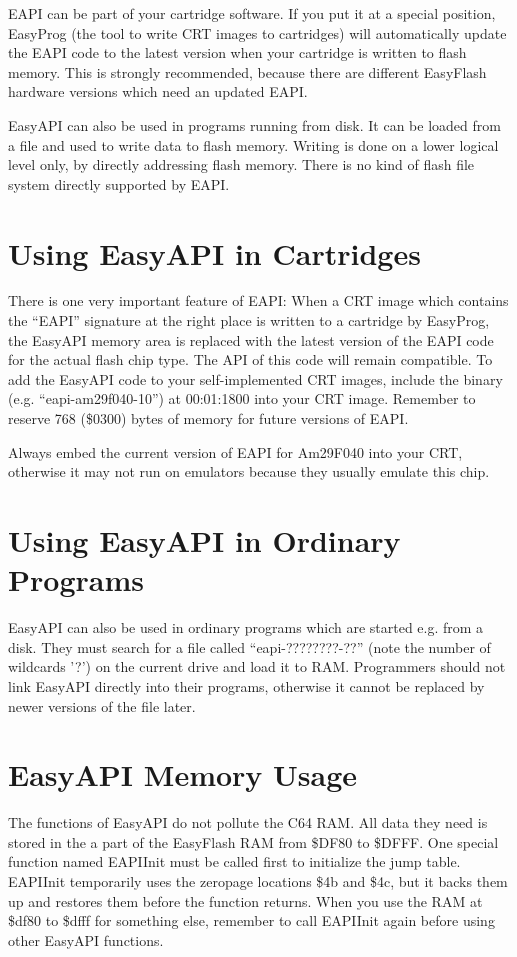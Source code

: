 \documentclass[a4paper,oneside]{memoir}
\begin{document}
EAPI can be part of your cartridge software. If you put it at a special
position, EasyProg (the tool to write CRT images to cartridges) will
automatically update the EAPI code to the latest version when your cartridge is
written to flash memory. This is strongly recommended, because there are
different EasyFlash hardware versions which need an updated EAPI.

EasyAPI can also be used in programs running from disk. It can be loaded from a
file and used to write data to flash memory. Writing is done on a lower logical
level only, by directly addressing flash memory. There is no kind of flash file
system directly supported by EAPI.

\section{Using EasyAPI in Cartridges}

There is one very important feature of EAPI: When a CRT image which contains
the “EAPI” signature at the right place is written to a cartridge by EasyProg,
the EasyAPI memory area is replaced with the latest version of the EAPI code
for the actual flash chip type. The API of this code will remain compatible. To
add the EasyAPI code to your self-implemented CRT images, include the binary
(e.g. “eapi-am29f040-10”) at 00:01:1800 into your CRT image. Remember to
reserve 768 (\$0300) bytes of memory for future versions of EAPI.

Always embed the current version of EAPI for Am29F040 into your CRT, otherwise
it may not run on emulators because they usually emulate this chip.

\section{Using EasyAPI in Ordinary Programs}

EasyAPI can also be used in ordinary programs which are started e.g. from a
disk. They must search for a file called “eapi-????????-??” (note the number of
wildcards '?') on the current drive and load it to RAM. Programmers should not
link EasyAPI directly into their programs, otherwise it cannot be replaced by
newer versions of the file later.

\section{EasyAPI Memory Usage}

The functions of EasyAPI do not pollute the C64 RAM. All data they need is
stored in the a part of the EasyFlash RAM from \$DF80 to \$DFFF. One special
function named EAPIInit must be called first to initialize the jump table.
EAPIInit temporarily uses the zeropage locations \$4b and \$4c, but it backs
them up and restores them before the function returns.
When you use the RAM at \$df80 to \$dfff for something else, remember to call
EAPIInit again before using other EasyAPI functions.
\end{document}
